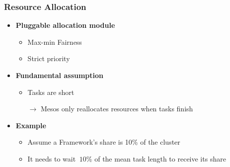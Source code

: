 \begin{frame}
\frametitle{Resource Allocation}
\begin{itemize}
	\item {\bf Pluggable allocation module}
	\begin{itemize}
		\item Max-min Fairness
		\item Strict priority
	\end{itemize}

\vspace{20pt}

	\item {\bf Fundamental assumption}
	\begin{itemize}
		\item Tasks are short
		\item[$\to$] Mesos only reallocates resources when tasks finish
	\end{itemize}

\vspace{20pt}

	\item {\bf Example}
	\begin{itemize}
		\item Assume a Framework's share is 10\% of the cluster
		\item It needs to wait $~10$\% of the mean task length to receive its share
	\end{itemize}
\end{itemize}
\end{frame}

